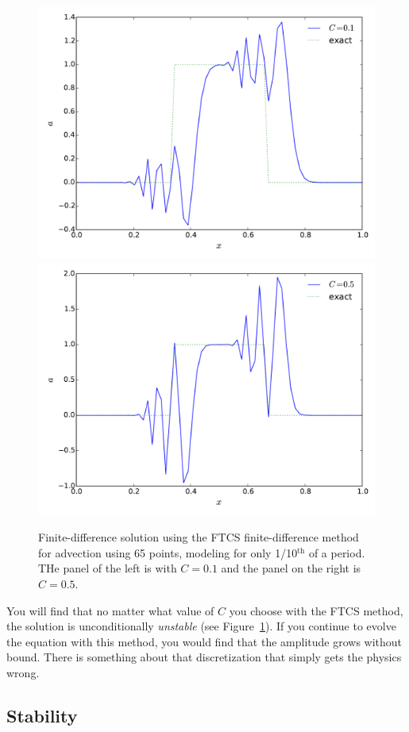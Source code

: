 \begin{figure}[t]
\centering
\includegraphics[width=0.48\linewidth]{fdadvect-FTCS-C0_1}
\includegraphics[width=0.48\linewidth]{fdadvect-FTCS-C0_5}
\caption[FTCS finite-difference solution to linear advection]
{\label{fig:fdadvect-ftcs} Finite-difference solution using the FTCS
finite-difference method for advection using 65 points, modeling for
only 1/10$^\mathrm{th}$ of a period.  THe panel of the left is
with $C = 0.1$ and the panel on the right is $C = 0.5$.\\
}
\end{figure}

You will find that no matter what value of $C$ you choose with the
FTCS method, the solution is unconditionally {\em unstable} (see
Figure~\ref{fig:fdadvect-ftcs}).  If you continue to evolve the
equation with this method, you would find that the amplitude grows
without bound.  There is something about that discretization that
simply gets the physics wrong.


\subsection{Stability}


